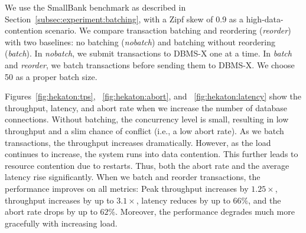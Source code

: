 
We use the SmallBank benchmark as described in Section~\ref{subsec:experiment:batching}, with a Zipf skew of 0.9 as a high-data-contention scenario. We compare transaction batching and reordering (\emph{reorder}) with two baselines: no batching (\emph{nobatch}) and batching without reordering (\emph{batch}). In \emph{nobatch}, we submit transactions to DBMS-X one at a time. In \emph{batch} and \emph{reorder}, we batch transactions before sending them to DBMS-X. We choose 50 as a proper batch size.

Figures~\ref{fig:hekaton:tps}, ~\ref{fig:hekaton:abort}, and ~\ref{fig:hekaton:latency} show the throughput, latency, and abort rate when we increase the number of database connections. Without batching, the concurrency level is small, resulting in low throughput and a slim chance of conflict (i.e., a low abort rate). 
As we batch transactions, the throughput increases dramatically. 
However, as the load continues to increase, the system runs into data contention. This further leads to resource contention due to restarts. Thus, both the abort rate and the average latency rise significantly. When we batch and reorder transactions, the performance improves on all metrics: Peak throughput increases by $1.25\times$, throughput increases by up to $3.1\times$, latency reduces by up to $66\%$, and the abort rate drops by up to $62\%$.  Moreover, the performance degrades much more gracefully with increasing load.
